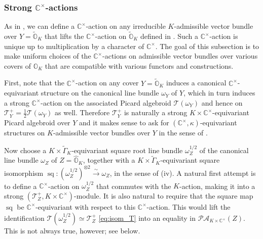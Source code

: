 \documentclass[11pt, a4paper]{amsart}
\newcommand{\C}{\mathbb{C}}
\newcommand{\orb}{\mathbb{O}}
\newcommand{\orbk}{\orb_{K}}
\newcommand{\torbk}{\widetilde{\orb}_{K}}
\newcommand{\horbk}{\widehat{\orb}_{K}}
\newcommand{\tGamma}{\widetilde{\Gamma}}
\DeclareMathOperator{\sq}{sq}
\newcommand{\smallhalf}{{\scriptscriptstyle 1/2}}
\newcommand{\TT}{\mathscr{T}}
\newcommand{\PicAlg}{\mathscr{PA}}
\newcommand{\cm}{\C^\times}
\theoremstyle{definition}
\numberwithin{equation}{section}
\begin{document}
\subsubsection{Strong \texorpdfstring{$\cm$}{C\textasciicircum{}*}-actions} \label{subsubsec:strong_cm_action}

As in \cite[Proposition 2.4.1]{LY}, we can define a $\cm$-action on any irreducible $K$-admissible vector bundle over $Y = \torbk$ that lifts the $\cm$-action on $\torbk$ defined in . Such a $\cm$-action is unique up to multiplication by a character of $\cm$. The goal of this subsection is to make uniform choices of the $\cm$-actions on admissible vector bundles over various covers of $\orbk$ that are compatible with various functors and constructions.

First, note that the $\cm$-action on any cover $Y = \torbk$ induces a canonical $\cm$-equivariant structure on the canonical line bundle $\omega_Y$ of $Y$, which in turn induces a strong $\cm$-action on the associated Picard algebroid $\TT(\omega_Y)$ and hence on $\TT^+_Y = \frac{1}{2} \TT(\omega_Y)$ as well. Therefore $\TT^+_Y$ is naturally a strong $K \times \cm$-equivariant Picard algebroid over $Y$ and it makes sense to ask for $(\cm, \kappa)$-equivariant structures on $K$-admissible vector bundles over $Y$ in the sense of .

Now choose a $K \times \tGamma_K$-equivariant square root line bundle $\omega_Z^{\smallhalf}$ of the canonical line bundle $\omega_Z$ of $Z = \horbk$, together with a $K \times \tGamma_K$-equivariant square isomorphism $\sq: (\omega_Z^{\smallhalf})^{\otimes 2} \xrightarrow{\sim} \omega_Z$, in the sense of  (iv). 
A natural first attempt is to define a $\cm$-action on $\omega_Z^{\smallhalf}$ that commutes with the $K$-action, making it into a strong $(\TT^+_Z, K \times \cm)$-module. 
It is also natural to require that the square map $\sq$ be $\cm$-equivariant with respect to this $\cm$-action. This would lift the identification $\TT(\omega_Z^{\smallhalf}) \simeq \TT^+_Z$ \eqref{eq:isom_T} into an equality in $\PicAlg_{K \times \cm}(Z)$.
This is not always true, however; see  below. 
\end{document}

